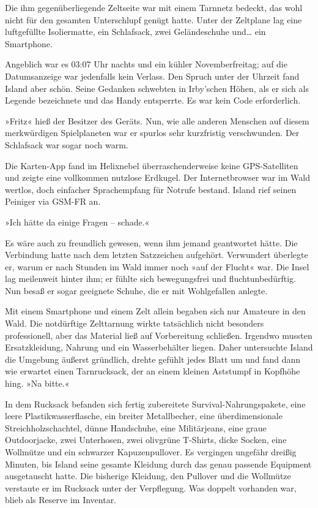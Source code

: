 Die ihm gegenüberliegende Zeltseite war mit einem Tarnnetz bedeckt, das wohl nicht für den gesamten Unterschlupf genügt hatte. Unter der Zeltplane lag eine luftgefüllte Isoliermatte, ein Schlafsack, zwei Geländeschuhe und… ein Smartphone.


Angeblich war es 03:07 Uhr nachts und ein kühler Novemberfreitag; auf die Datumsanzeige war jedenfalls kein Verlass. Den Spruch unter der Uhrzeit fand Island aber schön. Seine Gedanken schwebten in Irby’schen Höhen, als er sich als Legende bezeichnete und das Handy entsperrte. Es war kein Code erforderlich.

»Fritz« hieß der Besitzer des Geräts. Nun, wie alle anderen Menschen auf diesem merkwürdigen Spielplaneten war er spurlos sehr kurzfristig verschwunden. Der Schlafsack war sogar noch warm.

Die Karten-App fand im Helixnebel überraschenderweise keine GPS-Satelliten und zeigte eine vollkommen nutzlose Erdkugel. Der Internetbrowser war im Wald wertlos, doch einfacher Sprachempfang für Notrufe bestand. Island rief seinen Peiniger via GSM-FR an.


»Ich hätte da einige Fragen – schade.«

Es wäre auch zu freundlich gewesen, wenn ihm jemand geantwortet hätte. Die Verbindung hatte nach dem letzten Satzzeichen aufgehört. Verwundert überlegte er, warum er nach Stunden im Wald immer noch »auf der Flucht« war. Die Insel lag meilenweit hinter ihm; er fühlte sich bewegungsfrei und fluchtunbedürftig. Nun besaß er sogar geeignete Schuhe, die er mit Wohlgefallen anlegte.

Mit einem Smartphone und einem Zelt allein begaben sich nur Amateure in den Wald. Die notdürftige Zelttarnung wirkte tatsächlich nicht besonders professionell, aber das Material ließ auf Vorbereitung schließen. Irgendwo mussten Ersatzkleidung, Nahrung und ein Wasserbehälter liegen. Daher untersuchte Island die Umgebung äußerst gründlich, drehte gefühlt jedes Blatt um und fand dann wie erwartet einen Tarnrucksack, der an einem kleinen Aststumpf in Kopfhöhe hing. »Na bitte.«

In dem Rucksack befanden sich fertig zubereitete Survival-Nahrungspakete, eine leere Plastikwasserflasche, ein breiter Metallbecher, eine überdimensionale Streichholzschachtel, dünne Handschuhe, eine Militärjeans, eine graue Outdoorjacke, zwei Unterhosen, zwei olivgrüne T-Shirts, dicke Socken, eine Wollmütze und ein schwarzer Kapuzenpullover. Es vergingen ungefähr dreißig Minuten, bis Island seine gesamte Kleidung durch das genau passende Equipment ausgetauscht hatte. Die bisherige Kleidung, den Pullover und die Wollmütze verstaute er im Rucksack unter der Verpflegung. Was doppelt vorhanden war, blieb als Reserve im Inventar.

